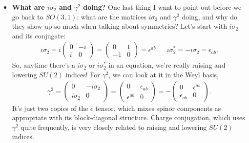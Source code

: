 \documentclass[12pt, oneside]{article}   	%
\theoremstyle{definition}
\begin{document}
\begin{itemize}
	\item \textbf{What are $i\sigma_2$ and $\gamma^2$ doing?} One last thing I want to point out before we go back to $SO(3, 1)$: what are the matrices $i\sigma_2$ and $\gamma^2$ doing, and why do they show up so much when talking about symmetries? Let's start with $i\sigma_2$ and its conjugate:
	\begin{align}
		i\sigma_2 = i\begin{pmatrix} 0 & -i \\ i & 0 \end{pmatrix} = \begin{pmatrix} 0 & 1 \\ -1 & 0 \end{pmatrix} = \epsilon^{ab} && i\sigma_2^* = -i\sigma_2 = \epsilon_{ab}.
	\end{align}
	So, anytime there's a $i\sigma_2$ or $i\sigma_2^*$ in an equation, we're really raising and lowering $SU(2)$ indices! For $\gamma^2$, we can look at it in the Weyl basis,
	\begin{align}
		\gamma^2 = \begin{pmatrix} 0 & -i\sigma_2 \\ i\sigma_2 & 0 \end{pmatrix} = \begin{pmatrix} 0 & \epsilon_{ab} \\ \epsilon^{ab} & 0 \end{pmatrix} = -\begin{pmatrix} 0 & \epsilon^{ab} \\ \epsilon_{ab} & 0 \end{pmatrix}.
	\end{align}
	It's just two copies of the $\epsilon$ tensor, which mixes spinor components as appropriate with its block-diagonal structure. Charge conjugation, which uses $\gamma^2$ quite frequently, is very closely related to raising and lowering $SU(2)$ indices. 
	

\end{itemize}
\end{document}
